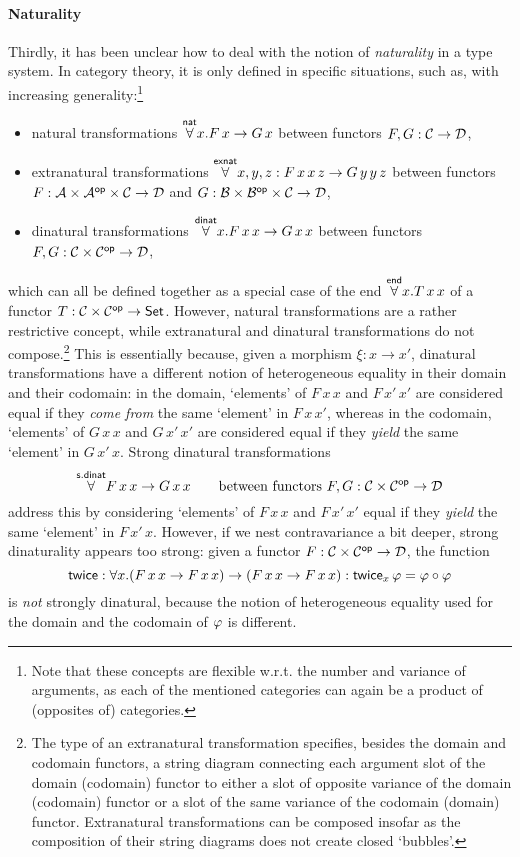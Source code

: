 \documentclass{lmcs} %
\theoremstyle{plain}\newtheorem{satz}[thm]{Satz} %
\theoremstyle{plain}
\theoremstyle{definition}
\begin{document}
\paragraph{Naturality}
Thirdly, it has been unclear how to deal with the notion of \emph{naturality} in a type system.
In category theory, it is only defined in specific situations, such as, with increasing generality:\footnote{Note that these concepts are flexible w.r.t. the number and variance of arguments, as each of the mentioned categories can again be a product of (opposites of) categories.}
\begin{itemize}
	\item natural transformations $\overset{\mathsf{nat}}{\forall} x . F\,x \to G\,x$ between functors $F, G : {\mathcal{C}} \to {\mathcal{D}}$,
	\item extranatural transformations $\overset{\mathsf{exnat}}{\forall} x, y, z : F\,x\,x\,z \to G\,y\,y\,z$ between functors $F : \mathcal{A} \times \mathcal{A}^{\mathsf{op}} \times {\mathcal{C}} \to {\mathcal{D}}$ and $G : \mathcal{B} \times \mathcal{B}^{\mathsf{op}} \times {\mathcal{C}} \to {\mathcal{D}}$,
	\item dinatural transformations $\overset{\mathsf{dinat}}{\forall} x.F\,x\,x \to G\,x\,x$ between functors $F, G : {\mathcal{C}} \times {\mathcal{C}}^{\mathsf{op}} \to {\mathcal{D}}$,
\end{itemize}
which can all be defined together as a special case of the end $\overset{\mathsf{end}}{\forall} x.T\,x\,x$ of a functor $T : {\mathcal{C}} \times {\mathcal{C}}^{\mathsf{op}} \to {\mathsf{Set}}$.
However, natural transformations are a rather restrictive concept, while extranatural and dinatural transformations do not compose.\footnote{The type of an extranatural transformation specifies, besides the domain and codomain functors, a string diagram connecting each argument slot of the domain (codomain) functor to either a slot of opposite variance of the domain (codomain) functor or a slot of the same variance of the codomain (domain) functor. Extranatural transformations can be composed insofar as the composition of their string diagrams does not create closed `bubbles'.}
This is essentially because, given a morphism $\xi : x \to x'$, dinatural transformations have a different notion of heterogeneous equality in their domain and their codomain: in the domain, `elements' of $F\,x\,x$ and $F\,x'\,x'$ are considered equal if they \emph{come from} the same `element' in $F\,x\,x'$, whereas in the codomain, `elements' of $G\,x\,x$ and $G\,x'\,x'$ are considered equal if they \emph{yield} the same `element' in $G\,x'\,x$.
Strong dinatural transformations
\[
	\overset{\mathsf{s.dinat}}{\forall} F\,x\,x \to G\,x\,x \qquad \text{between functors $F, G : {\mathcal{C}} \times {\mathcal{C}}^{\mathsf{op}} \to {\mathcal{D}}$}
\]
address this by considering `elements' of $F\,x\,x$ and $F\,x'\,x'$ equal if they \emph{yield} the same `element' in $F\,x'\,x$.
However, if we nest contravariance a bit deeper, strong dinaturality appears too strong: given a functor $F : {\mathcal{C}} \times {\mathcal{C}}^{\mathsf{op}} \to {\mathcal{D}}$, the function
\[
	\mathsf{twice} : \forall x . (F\,x\,x \to F\,x\,x) \to (F\,x\,x \to F\,x\,x) : \mathsf{twice}_x\,\varphi = \varphi \circ \varphi
\]
is \emph{not} strongly dinatural, because the notion of heterogeneous equality used for the domain and the codomain of $\varphi$ is different.
\end{document}
